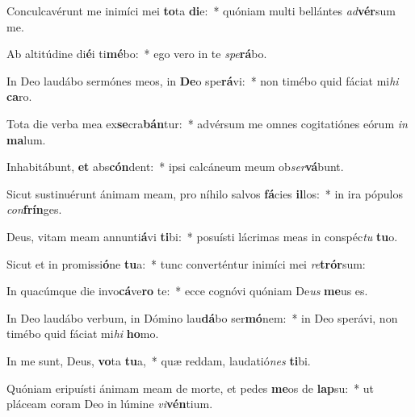 \item Conculcavérunt me inimíci mei \textbf{to}ta \textbf{di}e:~* quóniam multi bellántes \textit{ad}\textbf{vér}sum me.
\item Ab altitúdine di\textbf{é}i ti\textbf{mé}bo:~* ego vero in te \textit{spe}\textbf{rá}bo.
\item In Deo laudábo sermónes meos, in \textbf{De}o spe\textbf{rá}vi:~* non timébo quid fáciat mi\textit{hi} \textbf{ca}ro.
\item Tota die verba mea ex\textbf{se}cra\textbf{bán}tur:~* advérsum me omnes cogitatiónes eórum \textit{in} \textbf{ma}lum.
\item Inhabitábunt, \textbf{et} abs\textbf{cón}dent:~* ipsi calcáneum meum ob\textit{ser}\textbf{vá}bunt.
\item Sicut sustinuérunt ánimam meam, pro níhilo salvos \textbf{fá}cies \textbf{il}los:~* in ira pópulos \textit{con}\textbf{frín}ges.
\item Deus, vitam meam annunti\textbf{á}vi \textbf{ti}bi:~* posuísti lácrimas meas in conspéc\textit{tu} \textbf{tu}o.
\item Sicut et in promissi\textbf{ó}ne \textbf{tu}a:~* tunc converténtur inimíci mei \textit{re}\textbf{trór}sum:
\item In quacúmque die invo\textbf{cá}ve\textbf{ro} te:~* ecce cognóvi quóniam De\textit{us} \textbf{me}us es.
\item In Deo laudábo verbum, in Dómino lau\textbf{dá}bo ser\textbf{mó}nem:~* in Deo sperávi, non timébo quid fáciat mi\textit{hi} \textbf{ho}mo.
\item In me sunt, Deus, \textbf{vo}ta \textbf{tu}a,~* quæ reddam, laudatió\textit{nes} \textbf{ti}bi.
\item Quóniam eripuísti ánimam meam de morte, et pedes \textbf{me}os de \textbf{lap}su:~* ut pláceam coram Deo in lúmine \textit{vi}\textbf{vén}tium.
